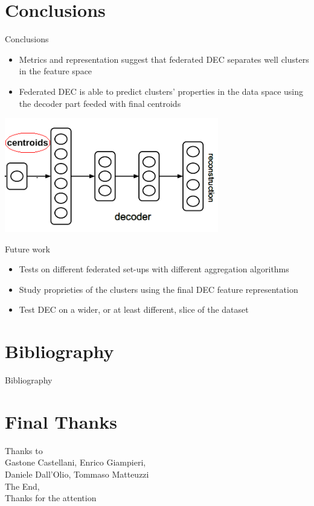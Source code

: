 \documentclass{beamer}
\begin{document}
\section{Conclusions}

\begin{frame}{Conclusions}
	\begin{itemize}
		\item Metrics and representation suggest that federated DEC separates well clusters in the feature space
		\vspace{0.5cm}
		\item Federated DEC is able to predict clusters' properties in the data space using the decoder part feeded with final centroids
	\end{itemize}
	\centering
	\includegraphics[width=0.7\textwidth, keepaspectratio]{./images/DEC_decoder1.png}
\end{frame}

\begin{frame}{Future work}
	\begin{itemize}
		\item Tests on different federated set-ups with different aggregation algorithms
		\vspace{0.5cm}
		\item Study proprieties of the clusters using the final DEC feature representation
		\vspace{0.5cm}
		\item Test DEC on a wider, or at least different, slice of the dataset
	\end{itemize}
\end{frame}

\section{Bibliography}

\begin{frame}{Bibliography}
	\fontsize{8pt}{7.2}\selectfont
	
	
\end{frame}

\section{Final Thanks}

\begin{frame}{}
	Thanks to\\
	Gastone Castellani, Enrico Giampieri,\\Daniele Dall'Olio, Tommaso Matteuzzi\\
	\vspace{3cm}
	The End,\\
	Thanks for the attention
\end{frame}
\end{document}
